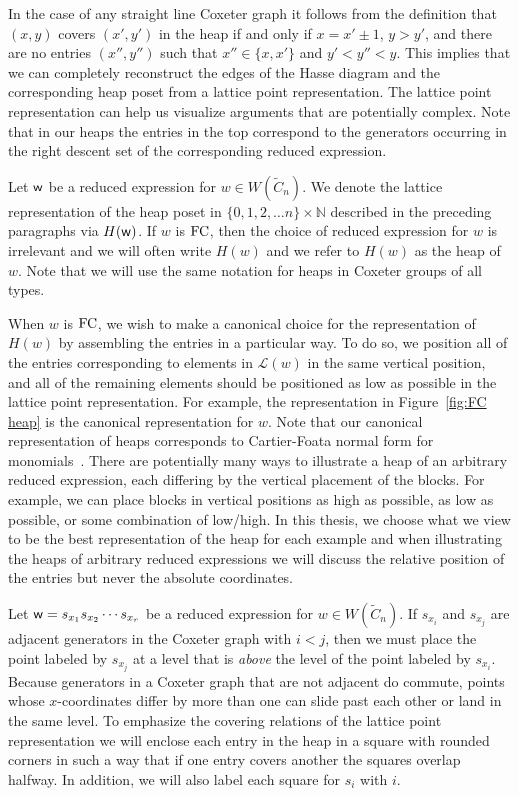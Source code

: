 In the case of any straight line Coxeter graph it follows from the definition that $(x,y)$ covers $(x',y')$ in the heap if and only if $x = x' \pm 1$, $y > y'$, and there are no entries $(x'', y'')$ such that $x'' \in \{x, x'\}$ and $y'< y'' < y$. This implies that we can completely reconstruct the edges of the Hasse diagram and the corresponding heap poset from a lattice point representation. The lattice point representation can help us visualize arguments that are potentially complex. Note that in our heaps the entries in the top correspond to the generators occurring in the right descent set of the corresponding reduced expression.

Let $\mathsf{w}$ be a reduced expression for $w \in W(\widetilde{C}_n)$. We denote the lattice representation of the heap poset in $\{0,1,2, \ldots n\} \times \mathbb{N}$ described in the preceding paragraphs via $H(\mathsf{w})$. If $w$ is $\mathrm{FC}$, then the choice of reduced expression for $w$ is irrelevant and we will often write $H(w)$ and we refer to $H(w)$ as the heap of $w$. Note that we will use the same notation for heaps in Coxeter groups of all types.

When $w$ is $\mathrm{FC}$, we wish to make a canonical choice for the representation of $H(w)$ by assembling the entries in a particular way. To do so, we position all of the entries corresponding to elements in $\mathcal{L}(w)$ in the same vertical position, and all of the remaining elements should be positioned as low as possible in the lattice point representation. For example, the representation in Figure~\ref{fig:FC heap} is the canonical representation for $w$. Note that our canonical representation of heaps corresponds to Cartier-Foata normal form for monomials~\cite{Cartier1969, Green2006a}. There are potentially many ways to illustrate a heap of an arbitrary reduced expression, each differing by the vertical placement of the blocks. For example, we can place blocks in vertical positions as high as possible, as low as possible, or some combination of low/high. In this thesis, we choose what we view to be the best representation of the heap for each example and when illustrating the heaps of arbitrary reduced expressions we will discuss the relative position of the entries but never the absolute coordinates. 

Let $\mathsf{w}=s_{x_1}s_{x_2}\cdots s_{x_r}$ be a reduced expression for $w \in W(\widetilde{C}_n)$. If $s_{x_i}$ and $s_{x_j}$ are adjacent generators in the Coxeter graph with $i<j$, then we must place the point labeled by $s_{x_j}$ at a level that is \emph{above} the level of the point labeled by $s_{x_i}$. Because generators in a Coxeter graph that are not adjacent do commute, points whose $x$-coordinates differ by more than one can slide past each other or land in the same level. To emphasize the covering relations of the lattice point representation we will enclose each entry in the heap in a square with rounded corners in such a way that if one entry covers another the squares overlap halfway. In addition, we will also label each square for $s_i$ with $i$.

